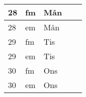 \documentclass[a4paper]{article}
\begin{document}
\begin{table}[ht!]
\begin{tabular}{lllp{7cm}p{7cm}}
\multicolumn{1}{|l|}{28} & \multicolumn{1}{l|}{fm} & \multicolumn{1}{l|}{Mån} & \multicolumn{1}{l|}{} & \multicolumn{1}{l|}{} \\ \hline
\multicolumn{1}{|l|}{28} & \multicolumn{1}{l|}{em} & \multicolumn{1}{l|}{Mån} & \multicolumn{1}{l|}{} & \multicolumn{1}{l|}{} \\ \hline    

\multicolumn{1}{|l|}{29} & \multicolumn{1}{l|}{fm} & \multicolumn{1}{l|}{Tis} & \multicolumn{1}{l|}{} & \multicolumn{1}{l|}{} \\ \hline
\multicolumn{1}{|l|}{29} & \multicolumn{1}{l|}{em} & \multicolumn{1}{l|}{Tis} & \multicolumn{1}{l|}{} & \multicolumn{1}{l|}{} \\ \hline    

\multicolumn{1}{|l|}{30} & \multicolumn{1}{l|}{fm} & \multicolumn{1}{l|}{Ons} & \multicolumn{1}{l|}{} & \multicolumn{1}{l|}{} \\ \hline
\multicolumn{1}{|l|}{30} & \multicolumn{1}{l|}{em} & \multicolumn{1}{l|}{Ons} & \multicolumn{1}{l|}{} & \multicolumn{1}{l|}{} \\ \hline    

    \end{tabular}
    \end{table}
    
\end{document}
